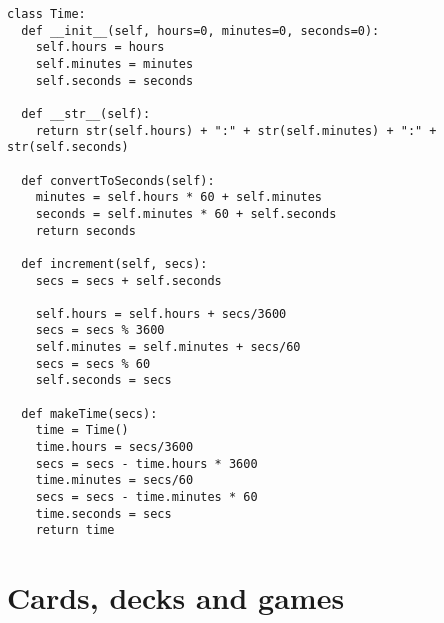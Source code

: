 \beforeverb
\begin{verbatim}
class Time:
  def __init__(self, hours=0, minutes=0, seconds=0):
    self.hours = hours
    self.minutes = minutes
    self.seconds = seconds

  def __str__(self):
    return str(self.hours) + ":" + str(self.minutes) + ":" + str(self.seconds)

  def convertToSeconds(self):
    minutes = self.hours * 60 + self.minutes
    seconds = self.minutes * 60 + self.seconds
    return seconds

  def increment(self, secs):
    secs = secs + self.seconds

    self.hours = self.hours + secs/3600
    secs = secs % 3600
    self.minutes = self.minutes + secs/60
    secs = secs % 60
    self.seconds = secs

  def makeTime(secs):
    time = Time()
    time.hours = secs/3600
    secs = secs - time.hours * 3600
    time.minutes = secs/60
    secs = secs - time.minutes * 60
    time.seconds = secs
    return time
\end{verbatim}
\afterverb


\section {Cards, decks and games}

